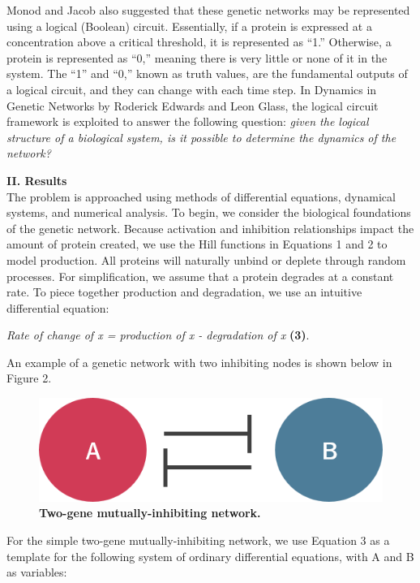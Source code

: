 \documentclass[11pt]{article}
\begin{document}
Monod and Jacob also suggested that these genetic networks may be represented using a logical (Boolean) circuit. Essentially, if a protein is expressed at a concentration above a critical threshold, it is represented as “1.” Otherwise, a protein is represented as “0,” meaning there is very little or none of it in the system. The “1” and “0,” known as truth values, are the fundamental outputs of a logical circuit, and they can change with each time step. In Dynamics in Genetic Networks by Roderick Edwards and Leon Glass, the logical circuit framework is exploited to answer the following question: \textit{given the logical structure of a biological system, is it possible to determine the dynamics of the network?}

\begin{center}
\end{center}
\textbf{II. Results}\\

The problem is approached using methods of differential equations, dynamical systems, and numerical analysis. To begin, we consider the biological foundations of the genetic network. Because activation and inhibition relationships impact the amount of protein created, we use the Hill functions in Equations 1 and 2 to model production. All proteins will naturally unbind or deplete through random processes. For simplification, we assume that a protein degrades at a constant rate. To piece together production and degradation, we use an intuitive differential equation:
\begin{center}
\textit{Rate of change of x = production of x - degradation of x} \textbf{(3)}.
\end{center}

An example of a genetic network with two inhibiting nodes is shown below in Figure 2.  

\begin{figure}[h]
\centering
\includegraphics[scale=0.4]{figure2}
\caption{\textbf{Two-gene mutually-inhibiting network.}}
\end{figure}

For the simple two-gene mutually-inhibiting network, we use Equation 3 as a template for the following system of ordinary differential equations, with A and B as variables:
\end{document}

